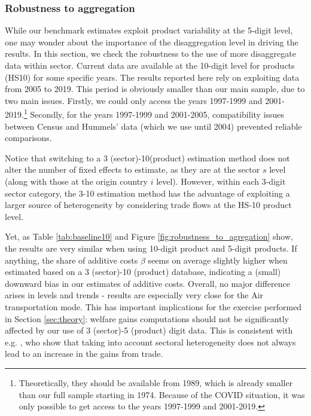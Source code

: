 \documentclass[a4paper,11pt]{article}
\begin{document}


\subsubsection{Robustness to aggregation}\label{sec:agg_main_text}

While our benchmark estimates exploit product variability at the 5-digit level, one may wonder about the importance of the disaggregation level in driving the results. In this section, we check the robustness to the use of more disaggregate data within sector.
Current data are available at the 10-digit level for products (HS10) for some specific years. The results reported here rely on exploiting data from 2005 to 2019. This period is obviously smaller than our main sample, due to two main issues. Firstly, we could only access the years 1997-1999 and 2001-2019.\footnote{Theoretically, they should be available from 1989, which is already smaller than our full sample starting in 1974. Because of the COVID situation, it was only possible to get access to the years 1997-1999 and 2001-2019.} Secondly, for the years 1997-1999 and 2001-2005, compatibility issues between Census and Hummels' data (which we use until 2004) prevented reliable comparisons.


Notice that switching to a 3 (sector)-10(product) estimation method does not alter the number of fixed effects to estimate, as they are at the sector $s$ level (along with those at the origin country $i$ level). However, within each 3-digit sector category, the 3-10 estimation method has the advantage of exploiting a larger source of heterogeneity by considering trade flows at the HS-10 product level.

Yet, as Table \ref{tab:baseline10} and 	Figure \ref{fig:robustness_to_agregation} show, the results are very similar when using 10-digit product and 5-digit products. If anything, the share of additive costs $\beta$ seems on average slightly higher when estimated based on a 3 (sector)-10 (product) database, indicating a (small) downward bias in our estimates of additive costs. Overall, no major difference arises in levels and trends - results are especially very close for the Air transportation mode. This has important implications for the exercise performed in Section \ref{sec:theory}: welfare gains computations should not be significantly affected by our use of 3 (sector)-5 (product) digit data. This is consistent with e.g. \citet{Giri_et_al2021}, who show that taking into account sectoral heterogeneity does not always lead to an increase in the gains from trade.
\end{document}
